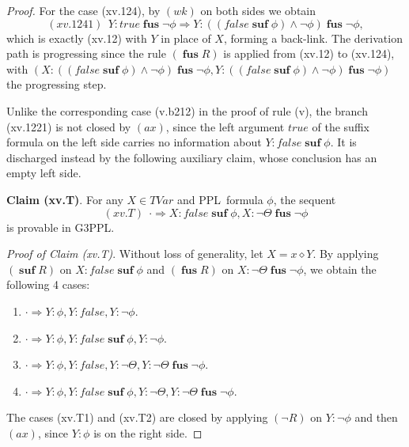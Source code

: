 \documentclass[manuscript,screen]{acmart}
\newcommand{\true}[0]{\mathit{true}}
\newcommand{\false}[0]{\mathit{false}}
\newcommand{\cat}[0]{\diamond}
\newcommand{\GiiiPPLcyc}[0]{\mbox{G3PPL}}
\DeclareMathOperator{\osuf}{\mathbf{suf}}
\DeclareMathOperator{\ofus}{\mathbf{fus}}
\newcommand{\TVar}[0]{\textit{TVar}}
\newcommand{\PPL}[0]{\mbox{PPL}}
\begin{document}
\begin{proof}
For the case (xv.124), by $(wk)$ on both sides we obtain
$$
(xv.1241)\ \ Y : \true\ofus \neg\phi\Rightarrow Y : ((\false\osuf\phi)\wedge \neg\phi)\ofus \neg\phi, 
$$
which is exactly (xv.12) with $Y$ in place of $X$, forming a back-link. 
The derivation path is progressing since the rule $(\ofus R)$ is applied from (xv.12) to (xv.124), with $(X : ((\false\osuf\phi)\wedge \neg\phi)\ofus \neg\phi, Y : ((\false\osuf\phi)\wedge \neg\phi)\ofus \neg\phi)$ the progressing step. 




\ifx
Unlike the corresponding case (v.b212) in the proof of rule (v), the branch (xv.1221) is not closed by $(ax)$, since the left argument $\true$ of the suffix formula on the left side carries no information about $Y : \false\osuf\phi$. 
It is discharged instead by the following auxiliary claim, whose conclusion has an empty left side. 

\textbf{Claim (xv.T)}. 
For any $X\in \TVar$ and \PPL\ formula $\phi$, the sequent
$$
(xv.T)\ \ \cdot\Rightarrow X : \false\osuf\phi, X : \neg\Theta\ofus \neg\phi
$$
is provable in \GiiiPPLcyc. 

\emph{Proof of Claim (xv.T)}. 
Without loss of generality, let $X = x\cat Y$. 
By applying $(\osuf R)$ on $X : \false\osuf\phi$ and $(\ofus R)$ on $X : \neg\Theta\ofus \neg\phi$, we obtain the following 4 cases: 
\begin{enumerate}
    \item[(xv.T1)] $\cdot\Rightarrow Y : \phi, Y : \false, Y : \neg\phi$. 
    \item[(xv.T2)] $\cdot\Rightarrow Y : \phi, Y : \false\osuf\phi, Y : \neg\phi$. 
    \item[(xv.T3)] $\cdot\Rightarrow Y : \phi, Y : \false, Y : \neg\Theta, Y : \neg\Theta\ofus \neg\phi$. 
    \item[(xv.T4)] $\cdot\Rightarrow Y : \phi, Y : \false\osuf\phi, Y : \neg\Theta, Y : \neg\Theta\ofus \neg\phi$. 
\end{enumerate}
The cases (xv.T1) and (xv.T2) are closed by applying $(\neg R)$ on $Y : \neg\phi$ and then $(ax)$, since $Y : \phi$ is on the right side. 


\end{proof}
\end{document}
